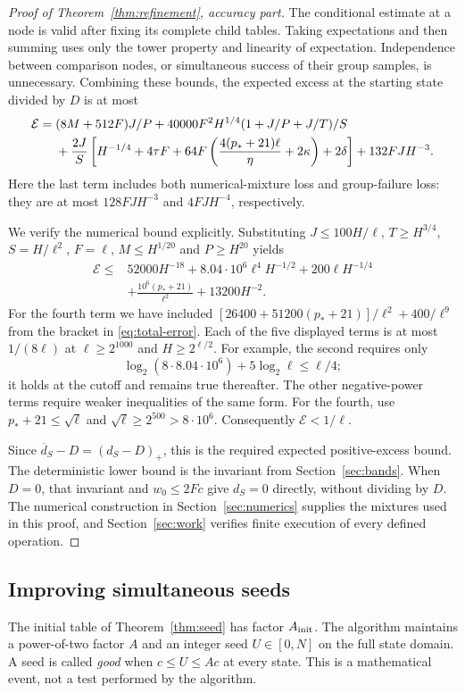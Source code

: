 \begin{proof}[Proof of Theorem~\ref{thm:refinement}, accuracy part]
The conditional estimate at a node is valid after fixing its complete
child tables. Taking expectations and then summing uses only the tower
property and linearity of expectation. Independence between comparison
nodes, or simultaneous success of their group samples, is unnecessary.
Combining these bounds, the expected excess at the starting state divided
by $D$ is at most
\begin{align}
 \mathcal E={}&(8M+512F)J/P
 +40000F^2H^{1/4}(1+J/P+J/T)/S \notag\\
 &+\frac{2J}{S}\left[
 H^{-1/4}+4\tau F
 +64F\left(\frac{4(p_*+21)\ell}{\eta}+2\kappa\right)
 +2\delta\right]
 +132FJH^{-3}.\label{eq:total-error}
\end{align}
Here the last term includes both numerical-mixture loss and group-failure
loss: they are at most $128FJH^{-3}$ and $4FJH^{-4}$, respectively.

We verify the numerical bound explicitly. Substituting
$J\le100H/\ell$, $T\ge H^{3/4}$, $S=H/\ell^2$, $F=\ell$,
$M\le H^{1/20}$ and $P\ge H^{20}$ yields
\begin{align*}
 \mathcal E\le{}&52000H^{-18}
 +8.04\cdot10^6\ell^4H^{-1/2}
 +200\ell H^{-1/4}\\
 &+\frac{10^6(p_*+21)}{\ell^2}+13200H^{-2}.
\end{align*}
For the fourth term we have included
$[26400+51200(p_*+21)]/\ell^2+400/\ell^9$ from the bracket in
\eqref{eq:total-error}. Each of the five displayed terms is at most
$1/(8\ell)$ at $\ell\ge2^{1000}$ and $H\ge2^{\ell/2}$.
For example, the second requires only
\[
 \log_2(8\cdot8.04\cdot10^6)+5\log_2\ell\le\ell/4;
\]
it holds at the cutoff and remains true thereafter. The other
negative-power terms require weaker inequalities of the same form.
For the fourth, use $p_*+21\le\sqrt\ell$ and
$\sqrt\ell\ge2^{500}>8\cdot10^6$.
Consequently $\mathcal E<1/\ell$.

Since $\overline d_S-D=(d_S-D)_+$, this is the required expected
positive-excess bound. The deterministic lower bound is the invariant
from Section~\ref{sec:bands}. When $D=0$, that invariant and
$w_0\le2Fc$ give $d_S=0$ directly, without dividing by $D$.
The numerical construction in Section~\ref{sec:numerics} supplies the
mixtures used in this proof, and Section~\ref{sec:work} verifies finite
execution of every defined operation.
\end{proof}

\subsection{Improving simultaneous seeds}
The initial table of Theorem~\ref{thm:seed} has factor $A_{\rm init}$.
The algorithm maintains a power-of-two factor $A$ and an integer seed
$U\in[0,N]$ on the full state domain. A seed is called \emph{good} when
$c\le U\le Ac$ at every state. This is a mathematical event, not a test
performed by the algorithm.

